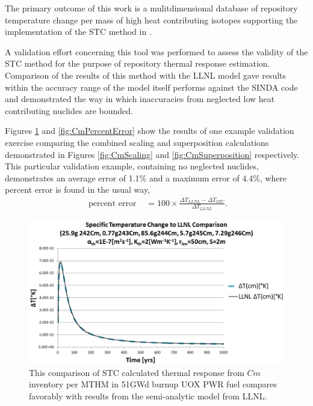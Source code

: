 
The primary outcome of this work is a mulitdimensional database of repository temperature 
change per mass of high heat contributing isotopes supporting the implementation 
of the \gls{STC} method in \Cyder. 

A validation effort concerning this tool was performed to assess the validity 
of the \gls{STC} method for the purpose of repository thermal response 
estimation.  Comparison of the results of this method with the \gls{LLNL} model 
\cite{greenberg_application_2012} gave results within the accuracy range of the 
model itself performs against the SINDA code \cite{huff_numerical_2012} and 
demonstrated the way in which inaccuracies from neglected low heat contributing 
nuclides are bounded. 

Figures \ref{fig:CmValidation} and \ref{fig:CmPercentError} show the results of 
one example validation exercise comparing the combined scaling and  
superposition calculations demonstrated in Figures \ref{fig:CmScaling} and 
\ref{fig:CmSuperposition} respectively. This particular validation example, 
containing no neglected nuclides, demonstrates an average error of 1.1\% and a 
maximum error of 4.4\%, where percent error is found in the usual way,
\begin{align}
\mbox{ percent error } &= 100\times\frac{\Delta T_{LLNL} - \Delta T_{STC}}{ \Delta T_{LLNL}}.
\end{align}

\begin{figure}[htp!]
\begin{center}
\includegraphics[width=\columnwidth]{./chapters/methodology/thermal_models/CmValidation.eps}
\end{center}
\caption{This comparison of \gls{STC} calculated thermal response from $Cm$ 
inventory per MTHM in 51GWd burnup UOX PWR fuel compares favorably with results 
from the semi-analytic model from LLNL.} 
\label{fig:CmValidation}
\end{figure}

